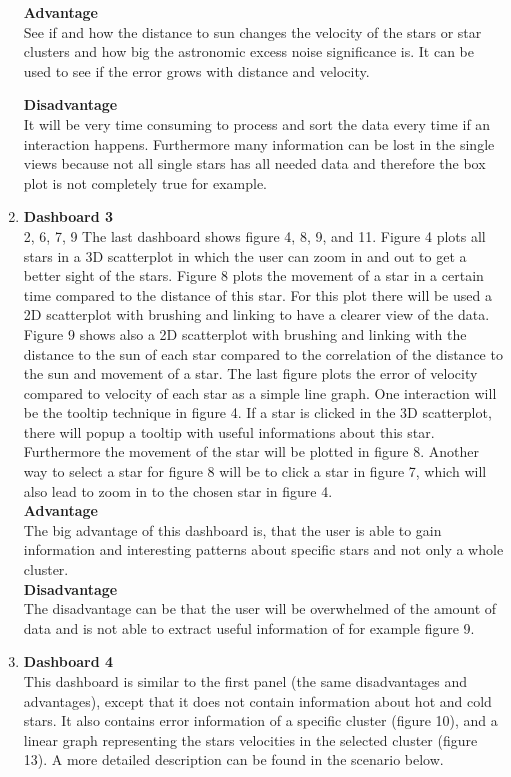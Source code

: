 \documentclass{article}
\begin{document}
\begin{enumerate}
\textbf{Advantage} \\
See if and how the distance to sun changes the velocity of the stars or star clusters and how big the astronomic excess noise significance is. It can be used to see if the error grows with distance and velocity.

\textbf{Disadvantage} \\
It will be very time consuming to process and sort the data every time if an interaction happens. Furthermore many information can be lost in the single views because not all single stars has all needed data and therefore the box plot is not completely true for example.

\item \textbf{Dashboard 3} \\
2, 6, 7, 9
The last dashboard shows figure 4, 8, 9, and 11. Figure 4 plots all stars in a 3D scatterplot in which the user can zoom in and out to get a better sight of the stars. Figure 8 plots the movement of a star in a certain time compared to the distance of this star. For this plot there will be used a 2D scatterplot with brushing and linking to have a clearer view of the data. Figure 9 shows also a 2D scatterplot with brushing and linking with the distance to the sun of each star compared to the correlation of the distance to the sun and movement of a star. The last figure plots the error of velocity compared to velocity of each star as a simple line graph. One interaction will be the tooltip technique in figure 4. If a star is clicked in the 3D scatterplot, there will popup a tooltip with useful informations about this star. Furthermore the movement of the star will be plotted in figure 8. Another way to select a star for figure 8 will be to click a star in figure 7, which will also lead to zoom in to the chosen star in figure 4. \\

\textbf{Advantage} \\
The big advantage of this dashboard is, that the user is able to gain information and interesting patterns about specific stars and not only a whole cluster. \\

\textbf{Disadvantage} \\
The disadvantage can be that the user will be overwhelmed of the amount of data and is not able to extract useful information of for example figure 9.  \\

\item \textbf{Dashboard 4} \\
This dashboard is similar to the first panel (the same disadvantages and advantages), except that it does not contain information about hot and cold stars. It also contains error information of a specific cluster (figure 10), and a linear graph representing the stars velocities in the selected cluster (figure 13). A more detailed description can be found in the scenario below.

\end{enumerate}
\end{document}

